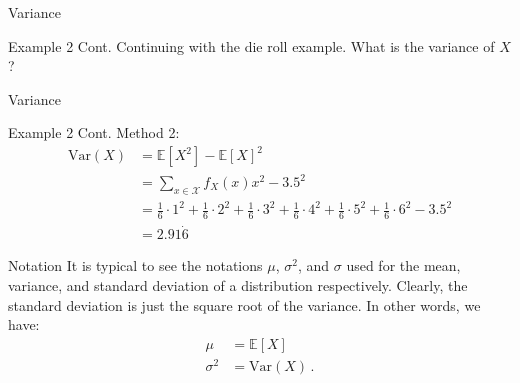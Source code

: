 \documentclass[10pt]{beamer}
\begin{document}
\begin{frame}[fragile]{Variance}
\begin{exampleblock}{Example 2 Cont.}
    Continuing with the die roll example. What is the variance of \(X\)?

\end{exampleblock}
\end{frame}

\begin{frame}[fragile]{Variance}
\begin{exampleblock}{Example 2 Cont.}
Method 2:
\begin{equation*}\begin{aligned}
    \text{Var}\left(X\right) &= \mathbb{E}\left[X^2\right] - \mathbb{E}\left[X\right]^2\\
     &= \sum_{x \in \mathcal{X}} f_X\left(x\right)x^2 - 3.5^2\\
     &= \frac{1}{6}\cdot 1^2 + \frac{1}{6}\cdot 2^2 + \frac{1}{6}\cdot 3^2 + \frac{1}{6}\cdot 4^2 + \frac{1}{6}\cdot 5^2 + \frac{1}{6}\cdot 6^2 - 3.5^2\\
     &= 2.91\dot{6}
\end{aligned}\end{equation*}
\end{exampleblock}
\end{frame}

\begin{frame}[fragile]{Notation}
It is typical to see the notations \(\mu\), \(\sigma^2\), and \(\sigma\) used for the mean, variance, and standard deviation of a distribution respectively. Clearly, the standard deviation is just the square root of the variance. In other words, we have:
\begin{equation*}\begin{aligned}
    \mu &= \mathbb{E}\left[X\right]\\
    \sigma^2 &= \text{Var}\left(X\right)\,.
\end{aligned}\end{equation*}
\end{frame}
\end{document}
